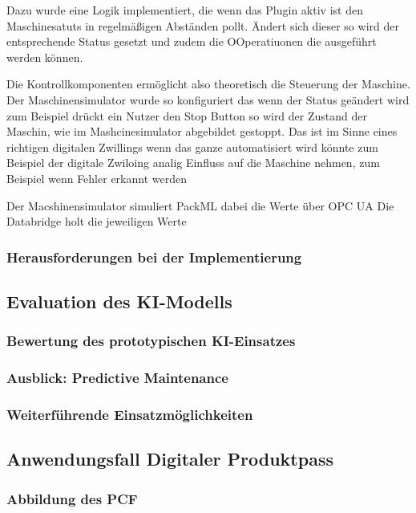 Dazu wurde eine Logik implementiert, die wenn das Plugin aktiv ist den Maschinesatuts in regelmäßigen Abständen pollt.
Ändert sich dieser so wird der entsprechende Status gesetzt und zudem die OOperatiuonen die ausgeführt werden können.

Die Kontrollkomponenten ermöglicht also theoretisch die Steuerung der Maschine.
Der Maschinensimulator wurde so konfiguriert das wenn der Status geändert wird zum Beispiel drückt ein Nutzer den Stop Button so wird der Zustand der Maschin, wie im Mashcinesimulator abgebildet gestoppt.
Das ist im Sinne eines richtigen digitalen Zwillings wenn das ganze automatisiert wird könnte zum Beispiel der digitale Zwiloing analig Einfluss auf die Maschine nehmen, zum Beispiel wenn Fehler erkannt werden



Der Macshinensimulator simuliert PackML dabei die Werte über OPC UA
Die Databridge holt die jeweiligen Werte

\subsubsection{Herausforderungen bei der Implementierung}

\subsection{Evaluation des KI-Modells}
\subsubsection{Bewertung des prototypischen KI-Einsatzes}
\subsubsection{Ausblick: Predictive Maintenance}
\subsubsection{Weiterführende Einsatzmöglichkeiten}

\subsection{Anwendungsfall Digitaler Produktpass}
\subsubsection{Abbildung des PCF}

